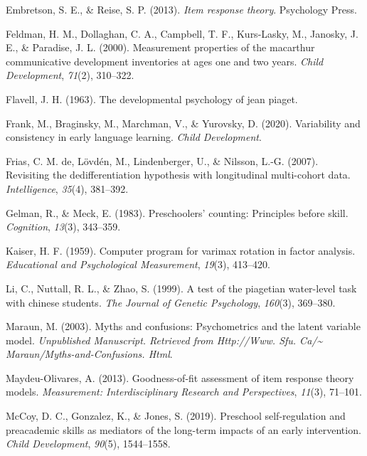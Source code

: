 \documentclass[10pt, letterpaper]{article}
\begin{document}
\leavevmode\hypertarget{ref-embretson2013item}{}%
Embretson, S. E., \& Reise, S. P. (2013). \emph{Item response theory}.
Psychology Press.

\leavevmode\hypertarget{ref-feldman2000measurement}{}%
Feldman, H. M., Dollaghan, C. A., Campbell, T. F., Kurs-Lasky, M.,
Janosky, J. E., \& Paradise, J. L. (2000). Measurement properties of the
macarthur communicative development inventories at ages one and two
years. \emph{Child Development}, \emph{71}(2), 310--322.

\leavevmode\hypertarget{ref-flavell1963developmental}{}%
Flavell, J. H. (1963). The developmental psychology of jean piaget.

\leavevmode\hypertarget{ref-wordbank}{}%
Frank, M., Braginsky, M., Marchman, V., \& Yurovsky, D. (2020).
Variability and consistency in early language learning. \emph{Child
Development}.

\leavevmode\hypertarget{ref-de2007revisiting}{}%
Frias, C. M. de, Lövdén, M., Lindenberger, U., \& Nilsson, L.-G. (2007).
Revisiting the dedifferentiation hypothesis with longitudinal
multi-cohort data. \emph{Intelligence}, \emph{35}(4), 381--392.

\leavevmode\hypertarget{ref-gelman1983preschoolers}{}%
Gelman, R., \& Meck, E. (1983). Preschoolers' counting: Principles
before skill. \emph{Cognition}, \emph{13}(3), 343--359.

\leavevmode\hypertarget{ref-kaiser1959computer}{}%
Kaiser, H. F. (1959). Computer program for varimax rotation in factor
analysis. \emph{Educational and Psychological Measurement},
\emph{19}(3), 413--420.

\leavevmode\hypertarget{ref-li1999test}{}%
Li, C., Nuttall, R. L., \& Zhao, S. (1999). A test of the piagetian
water-level task with chinese students. \emph{The Journal of Genetic
Psychology}, \emph{160}(3), 369--380.

\leavevmode\hypertarget{ref-maraun2003myths}{}%
Maraun, M. (2003). Myths and confusions: Psychometrics and the latent
variable model. \emph{Unpublished Manuscript. Retrieved from Http://Www.
Sfu. Ca/\textasciitilde{} Maraun/Myths-and-Confusions. Html}.

\leavevmode\hypertarget{ref-maydeu2013goodness}{}%
Maydeu-Olivares, A. (2013). Goodness-of-fit assessment of item response
theory models. \emph{Measurement: Interdisciplinary Research and
Perspectives}, \emph{11}(3), 71--101.

\leavevmode\hypertarget{ref-mccoy2019preschool}{}%
McCoy, D. C., Gonzalez, K., \& Jones, S. (2019). Preschool
self-regulation and preacademic skills as mediators of the long-term
impacts of an early intervention. \emph{Child Development},
\emph{90}(5), 1544--1558.
\end{document}
